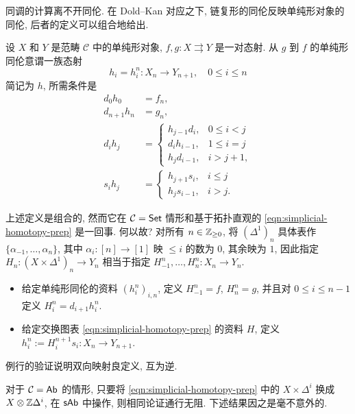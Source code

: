 同调的计算离不开同伦. 在 Dold--Kan 对应之下, 链复形的同伦反映单纯形对象的同伦, 后者的定义可以组合地给出.

\begin{definition}[单纯形同伦]\label{def:simplicial-homotopy}
	设 $X$ 和 $Y$ 是范畴 $\mathcal{C}$ 中的单纯形对象, $f, g: X \rightrightarrows Y$ 是一对态射. 从 $g$ 到 $f$ 的单纯形同伦意谓一族态射
	\[ h_i = h^n_i: X_n \to Y_{n+1}, \quad 0 \leq i \leq n \]
	简记为 $h$, 所需条件是
	\begin{align*}
		d_0 h_0 & = f_n, \\
		d_{n+1} h_n & = g_n, \\
		d_i h_j & = \begin{cases}
			h_{j-1} d_i, & 0 \leq i < j \\
			d_i h_{i-1}, & 1 \leq i = j \\
			h_j d_{i-1}, & i > j+1,
		\end{cases} \\
		s_i h_j & = \begin{cases}
			h_{j+1} s_i, & i \leq j \\
			h_j s_{i-1}, & i > j.
		\end{cases}
	\end{align*}
\end{definition}

上述定义是组合的, 然而它在 $\mathcal{C} = \mathsf{Set}$ 情形和基于拓扑直观的 \eqref{eqn:simplicial-homotopy-prep} 是一回事. 何以故? 对所有 $n \in \mathbb{Z}_{\geq 0}$, 将 $(\Delta^1)_n$ 具体表作 $\{\alpha_{-1}, \ldots, \alpha_n\}$, 其中 $\alpha_i: [n] \to [1]$ 映 $\leq i$ 的数为 $0$, 其余映为 $1$, 因此指定 $H_n: (X \times \Delta^1)_n \to Y_n$ 相当于指定 $H^n_{-1}, \ldots, H^n_n: X_n \to Y_n$.
\begin{itemize}
	\item 给定单纯形同伦的资料 $(h^n_i)_{i, n}$, 定义 $H^n_{-1} = f$, $H^n_n = g$, 并且对 $0 \leq i \leq n-1$ 定义 $H^n_i = d_{i+1} h^n_i$.
	\item 给定交换图表 \eqref{eqn:simplicial-homotopy-prep} 的资料 $H$, 定义 $h^n_i := H^{n+1}_{i} s_i: X_n \to Y_{n+1}$.
\end{itemize}
例行的验证说明双向映射良定义, 互为逆.

对于 $\mathcal{C} = \mathsf{Ab}$ 的情形, 只要将 \eqref{eqn:simplicial-homotopy-prep} 中的 $X \times \Delta^i$ 换成 $X \otimes \mathbb{Z}\Delta^i$, 在 $\mathsf{sAb}$ 中操作, 则相同论证通行无阻. 下述结果因之是毫不意外的.

